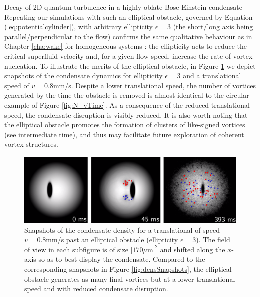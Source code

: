 \begin{chapter}{\label{cha:shin}Decay of 2D quantum turbulence in a highly oblate Bose-Einstein condensate}
Repeating our simulations with such an elliptical obstacle, governed by Equation (\ref{eq:potentialcylinder}), with arbitrary ellipticity $\epsilon=3$ (the short/long axis being parallel/perpendicular to the flow) confirms the same qualitative behaviour as in Chapter \ref{cha:wake} for homogeneous systems \citep{stagg_parker_14}: the ellipticity acts to reduce the critical superfluid velocity and, for a given flow speed, increase the rate of vortex nucleation. To illustrate the merits of the elliptical obstacle, in Figure \ref{fig:ellipse} we depict snapshots of the condensate dynamics for ellipticity $\epsilon=3$ and a translational speed of $v=0.8$mm/s. Despite a lower translational speed, the number of vortices generated by the time the obstacle is removed is almost identical to the circular example of Figure \ref{fig:N_vTime}.  As a consequence of the reduced translational speed, the condensate disruption is visibly reduced. It is also worth noting that the elliptical obstacle promotes the formation of clusters of like-signed vortices (see intermediate time), and thus may facilitate future exploration of coherent vortex structures.


\begin{figure}
\centering
\includegraphics[width=0.9\linewidth]{shin/fig6.png}
\caption{\label{fig:ellipse} Snapshots of the condensate density for a translational of speed $v=0.8$mm/s past an elliptical obstacle (ellipticity $\epsilon=3$). The field of view in each subfigure is of size $[170\mu$m$]^2$ and shifted along the $x$-axis so as to best display the condensate.  Compared to the corresponding snapshots in Figure \ref{fig:densSnapshots}, the elliptical obstacle generates as many final vortices but at a lower translational speed and with reduced condensate disruption.
}
\end{figure}

\end{chapter}
